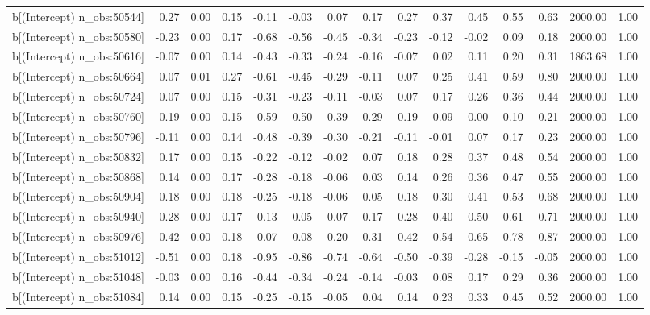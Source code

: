 \begin{table}[ht]
\begin{tabular}{rrrrrrrrrrrrrrr}
  b[(Intercept) n\_obs:50544] & 0.27 & 0.00 & 0.15 & -0.11 & -0.03 & 0.07 & 0.17 & 0.27 & 0.37 & 0.45 & 0.55 & 0.63 & 2000.00 & 1.00 \\ 
  b[(Intercept) n\_obs:50580] & -0.23 & 0.00 & 0.17 & -0.68 & -0.56 & -0.45 & -0.34 & -0.23 & -0.12 & -0.02 & 0.09 & 0.18 & 2000.00 & 1.00 \\ 
  b[(Intercept) n\_obs:50616] & -0.07 & 0.00 & 0.14 & -0.43 & -0.33 & -0.24 & -0.16 & -0.07 & 0.02 & 0.11 & 0.20 & 0.31 & 1863.68 & 1.00 \\ 
  b[(Intercept) n\_obs:50664] & 0.07 & 0.01 & 0.27 & -0.61 & -0.45 & -0.29 & -0.11 & 0.07 & 0.25 & 0.41 & 0.59 & 0.80 & 2000.00 & 1.00 \\ 
  b[(Intercept) n\_obs:50724] & 0.07 & 0.00 & 0.15 & -0.31 & -0.23 & -0.11 & -0.03 & 0.07 & 0.17 & 0.26 & 0.36 & 0.44 & 2000.00 & 1.00 \\ 
  b[(Intercept) n\_obs:50760] & -0.19 & 0.00 & 0.15 & -0.59 & -0.50 & -0.39 & -0.29 & -0.19 & -0.09 & 0.00 & 0.10 & 0.21 & 2000.00 & 1.00 \\ 
  b[(Intercept) n\_obs:50796] & -0.11 & 0.00 & 0.14 & -0.48 & -0.39 & -0.30 & -0.21 & -0.11 & -0.01 & 0.07 & 0.17 & 0.23 & 2000.00 & 1.00 \\ 
  b[(Intercept) n\_obs:50832] & 0.17 & 0.00 & 0.15 & -0.22 & -0.12 & -0.02 & 0.07 & 0.18 & 0.28 & 0.37 & 0.48 & 0.54 & 2000.00 & 1.00 \\ 
  b[(Intercept) n\_obs:50868] & 0.14 & 0.00 & 0.17 & -0.28 & -0.18 & -0.06 & 0.03 & 0.14 & 0.26 & 0.36 & 0.47 & 0.55 & 2000.00 & 1.00 \\ 
  b[(Intercept) n\_obs:50904] & 0.18 & 0.00 & 0.18 & -0.25 & -0.18 & -0.06 & 0.05 & 0.18 & 0.30 & 0.41 & 0.53 & 0.68 & 2000.00 & 1.00 \\ 
  b[(Intercept) n\_obs:50940] & 0.28 & 0.00 & 0.17 & -0.13 & -0.05 & 0.07 & 0.17 & 0.28 & 0.40 & 0.50 & 0.61 & 0.71 & 2000.00 & 1.00 \\ 
  b[(Intercept) n\_obs:50976] & 0.42 & 0.00 & 0.18 & -0.07 & 0.08 & 0.20 & 0.31 & 0.42 & 0.54 & 0.65 & 0.78 & 0.87 & 2000.00 & 1.00 \\ 
  b[(Intercept) n\_obs:51012] & -0.51 & 0.00 & 0.18 & -0.95 & -0.86 & -0.74 & -0.64 & -0.50 & -0.39 & -0.28 & -0.15 & -0.05 & 2000.00 & 1.00 \\ 
  b[(Intercept) n\_obs:51048] & -0.03 & 0.00 & 0.16 & -0.44 & -0.34 & -0.24 & -0.14 & -0.03 & 0.08 & 0.17 & 0.29 & 0.36 & 2000.00 & 1.00 \\ 
  b[(Intercept) n\_obs:51084] & 0.14 & 0.00 & 0.15 & -0.25 & -0.15 & -0.05 & 0.04 & 0.14 & 0.23 & 0.33 & 0.45 & 0.52 & 2000.00 & 1.00 \\ 

\end{tabular}
\end{table}
